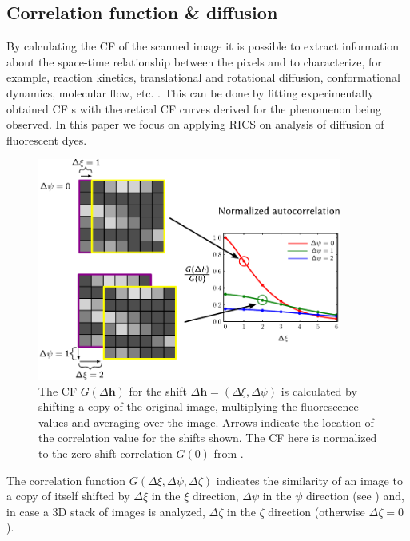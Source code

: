 \subsection{Correlation function \& diffusion}
By calculating the \ac{CF} of the scanned image
it is possible to extract information about the space-time relationship
between the pixels and to characterize, for example, reaction kinetics, translational and 
rotational diffusion, conformational dynamics, molecular flow, etc.
\citep{Digman_11_AnnuRevPhysChem_62_p645,Lakowicz_06_Springer,Haustein_07_AnnuRevBiophysBiomolStruct_36_p151}.
This can be done by fitting experimentally obtained \ac{CF} s with
theoretical \ac{CF} curves derived for the phenomenon being observed.
In this paper we focus on applying \acs{RICS} on analysis of diffusion of
fluorescent dyes.
\begin{figure}%
  \centering
    \includegraphics[width=10cm]{figures/rics_theory_2.pdf}
    \caption[Correlation function calculation]{
    The \acl{CF} $G(\Delta \mathbf{h})$ for the shift
    $\Delta \mathbf{h}=(\Delta\xi,\Delta\psi)$ is calculated by
    shifting a copy of the original image, multiplying the fluorescence
    values and averaging over the image. Arrows indicate the
    location of the correlation value for the shifts shown. The
    \ac{CF} here is normalized to the zero-shift
    correlation $G(0)$ from \Eq{~\ref{eq:G_0}}.}
  \label{fig:rics_theory2}
\end{figure}

The correlation function
$G(\Delta\xi,\Delta\psi,\Delta\zeta)$ indicates the
similarity of an image to a copy of itself shifted by $\Delta\xi$ in the
$\xi$
direction, $\Delta\psi$ in the $\psi$ direction (see
\F{~\ref{fig:rics_theory2}}) and, in case a 3D stack
of images is analyzed, $\Delta\zeta$ in the
$\zeta$ direction (otherwise $\Delta\zeta=0$).  

